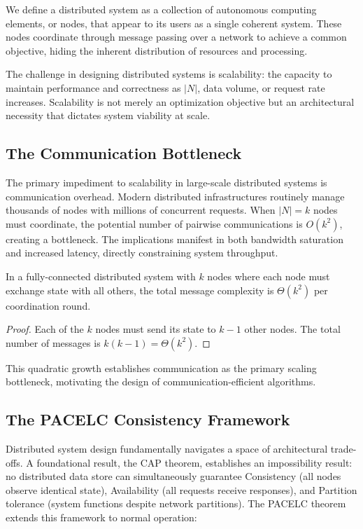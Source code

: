We define a distributed system as a collection of autonomous computing elements, or nodes, that appear to its users as a single coherent system. These nodes coordinate through message passing over a network to achieve a common objective, hiding the inherent distribution of resources and processing.

The challenge in designing distributed systems is scalability: the capacity to maintain performance and correctness as $|N|$, data volume, or request rate increases. Scalability is not merely an optimization objective but an architectural necessity that dictates system viability at scale.

\subsection{The Communication Bottleneck}

The primary impediment to scalability in large-scale distributed systems is communication overhead. Modern distributed infrastructures routinely manage thousands of nodes with millions of concurrent requests. When $|N| = k$ nodes must coordinate, the potential number of pairwise communications is $O(k^2)$, creating a bottleneck. The implications manifest in both bandwidth saturation and increased latency, directly constraining system throughput.

\begin{theorem}
    In a fully-connected distributed system with $k$ nodes where each node must exchange state with all others, the total message complexity is $\Theta(k^2)$ per coordination round.
\end{theorem}

\begin{proof}
    Each of the $k$ nodes must send its state to $k-1$ other nodes. The total number of messages is $k(k-1) = \Theta(k^2)$.
\end{proof}

This quadratic growth establishes communication as the primary scaling bottleneck, motivating the design of communication-efficient algorithms.

\subsection{The PACELC Consistency Framework}

Distributed system design fundamentally navigates a space of architectural trade-offs. A foundational result, the CAP theorem, establishes an impossibility result: no distributed data store can simultaneously guarantee Consistency (all nodes observe identical state), Availability (all requests receive responses), and Partition tolerance (system functions despite network partitions). The PACELC theorem extends this framework to normal operation:

